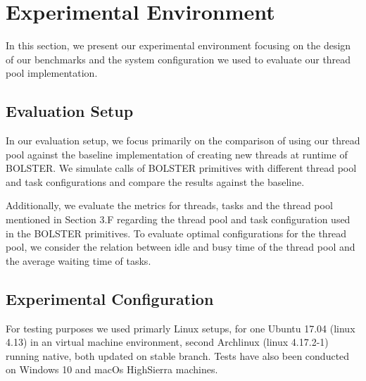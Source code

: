 \documentclass[conference]{IEEEtran}
\begin{document}
\section{Experimental Environment}
In this section, we present our experimental environment focusing on the design of our benchmarks and the system configuration we used to evaluate our thread pool implementation.

\subsection{Evaluation Setup}
In our evaluation setup, we focus primarily on the comparison of using our thread pool against the baseline implementation of creating new threads at runtime of BOLSTER. We simulate calls of BOLSTER primitives with different thread pool and task configurations and compare the results against the baseline.

Additionally, we evaluate the metrics for threads, tasks and the thread pool mentioned in Section 3.F regarding the thread pool and task configuration used in the BOLSTER primitives. To evaluate optimal configurations for the thread pool, we consider the relation between idle and busy time of the thread pool and the average waiting time of tasks.


\subsection{Experimental Configuration}

For testing purposes we used primarly Linux setups, for one Ubuntu 17.04
(linux 4.13) in an virtual machine environment, second Archlinux (linux
4.17.2-1) running native, both updated on stable branch. Tests have also been
conducted on Windows 10 and macOs HighSierra machines.
\end{document}
